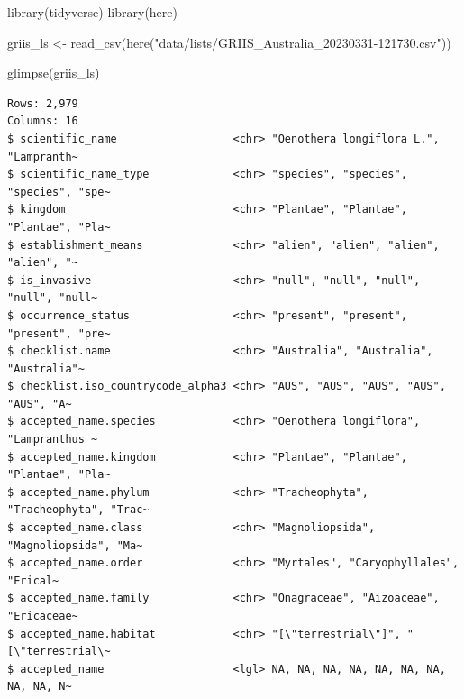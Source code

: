 \documentclass[
  letterpaper,
  DIV=11,
  numbers=noendperiod,
  oneside]{scrreprt}
\newenvironment{Shaded}{\begin{snugshade}}{\end{snugshade}}
\newcommand{\CommentTok}[1]{\textcolor[rgb]{0.37,0.37,0.37}{#1}}
\newcommand{\FunctionTok}[1]{\textcolor[rgb]{0.28,0.35,0.67}{#1}}
\newcommand{\NormalTok}[1]{\textcolor[rgb]{0.00,0.23,0.31}{#1}}
\newcommand{\OtherTok}[1]{\textcolor[rgb]{0.00,0.23,0.31}{#1}}
\newcommand{\SpecialCharTok}[1]{\textcolor[rgb]{0.37,0.37,0.37}{#1}}
\newcommand{\StringTok}[1]{\textcolor[rgb]{0.13,0.47,0.30}{#1}}
\begin{document}
\begin{Shaded}
\begin{Highlighting}[]
\FunctionTok{library}\NormalTok{(tidyverse)}
\FunctionTok{library}\NormalTok{(here)}

\NormalTok{griis\_ls }\OtherTok{\textless{}{-}} \FunctionTok{read\_csv}\NormalTok{(}\FunctionTok{here}\NormalTok{(}\StringTok{"data/lists/GRIIS\_Australia\_20230331{-}121730.csv"}\NormalTok{))}

\FunctionTok{glimpse}\NormalTok{(griis\_ls)}
\end{Highlighting}
\end{Shaded}

\begin{verbatim}
Rows: 2,979
Columns: 16
$ scientific_name                  <chr> "Oenothera longiflora L.", "Lampranth~
$ scientific_name_type             <chr> "species", "species", "species", "spe~
$ kingdom                          <chr> "Plantae", "Plantae", "Plantae", "Pla~
$ establishment_means              <chr> "alien", "alien", "alien", "alien", "~
$ is_invasive                      <chr> "null", "null", "null", "null", "null~
$ occurrence_status                <chr> "present", "present", "present", "pre~
$ checklist.name                   <chr> "Australia", "Australia", "Australia"~
$ checklist.iso_countrycode_alpha3 <chr> "AUS", "AUS", "AUS", "AUS", "AUS", "A~
$ accepted_name.species            <chr> "Oenothera longiflora", "Lampranthus ~
$ accepted_name.kingdom            <chr> "Plantae", "Plantae", "Plantae", "Pla~
$ accepted_name.phylum             <chr> "Tracheophyta", "Tracheophyta", "Trac~
$ accepted_name.class              <chr> "Magnoliopsida", "Magnoliopsida", "Ma~
$ accepted_name.order              <chr> "Myrtales", "Caryophyllales", "Erical~
$ accepted_name.family             <chr> "Onagraceae", "Aizoaceae", "Ericaceae~
$ accepted_name.habitat            <chr> "[\"terrestrial\"]", "[\"terrestrial\~
$ accepted_name                    <lgl> NA, NA, NA, NA, NA, NA, NA, NA, NA, N~
\end{verbatim}

\begin{Shaded}
\end{Shaded}
\end{document}
